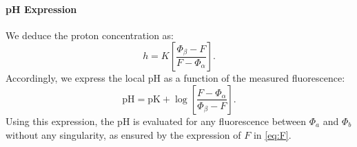 \documentclass[12pt]{article}
\begin{document}
\paragraph{pH Expression}
We deduce the proton concentration as:
\begin{equation}
h=K\left[\dfrac{\Phi_\beta-F}{F-\Phi_\alpha}\right].
\end{equation}
Accordingly, we express the local pH as a function of the measured fluorescence:
\begin{equation}
	\mathrm{pH} = \mathrm{pK} + \log  \left[ \dfrac{F-\Phi_\alpha}{\Phi_\beta-F}\right].
\end{equation}
Using this expression, the pH is evaluated for any fluorescence between $\Phi_a$ and $\Phi_b$ without any singularity,
as ensured by the expression of $F$ in \eqref{eq:F}.
\end{document}
